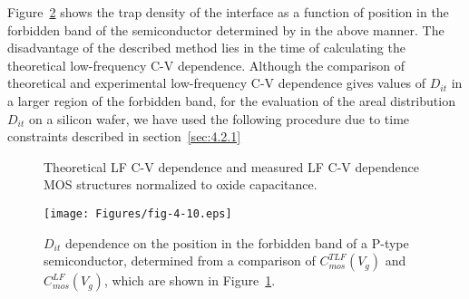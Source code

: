 Figure~\ref{fig:4.10} shows the trap density of the interface as a
function of position in the forbidden band of the semiconductor
determined by in the above manner.  The disadvantage of the described
method lies in the time of calculating the theoretical low-frequency
C-V dependence. Although the comparison of theoretical and
experimental low-frequency C-V dependence gives values of $D_{it}$ in
a larger region of the forbidden band, for the evaluation of the areal
distribution $D_{it}$ on a silicon wafer, we have used the following
procedure due to time constraints described in section~\ref{sec:4.2.1}

\begin{figure}[h!]\centering
  \begin{minipage}[c]{\myfiguresize}
    \begin{center}
      
      \caption[Theoretical LF C-V dependence and measured LF C-V
        dependence]{Theoretical LF C-V dependence and measured LF C-V
        dependence MOS structures normalized to oxide
        capacitance.}\label{fig:4.9}
    \end{center}
  \end{minipage}
\end{figure}

\begin{figure}[h!]\centering
  \begin{minipage}[c]{\myfiguresize}
    \begin{center}
      \texttt{[image: Figures/fig-4-10.eps]}
      \caption[Dependence of $D_{it}$ on the position in the forbidden
        band of the semiconductor determined from the comparison of
        $C_{mos}^{TLF}(V_{g})$ and $C_{mos}^{LF}(V_{g})$]{$D_{it}$
        dependence on the position in the forbidden band of a P-type
        semiconductor, determined from a comparison of
        $C_{mos}^{TLF}(V_{g})$ and $C_{mos}^{LF}(V_{g})$, which are
        shown in Figure~\ref{fig:4.9}.}\label{fig:4.10}
    \end{center}
  \end{minipage}
\end{figure}


